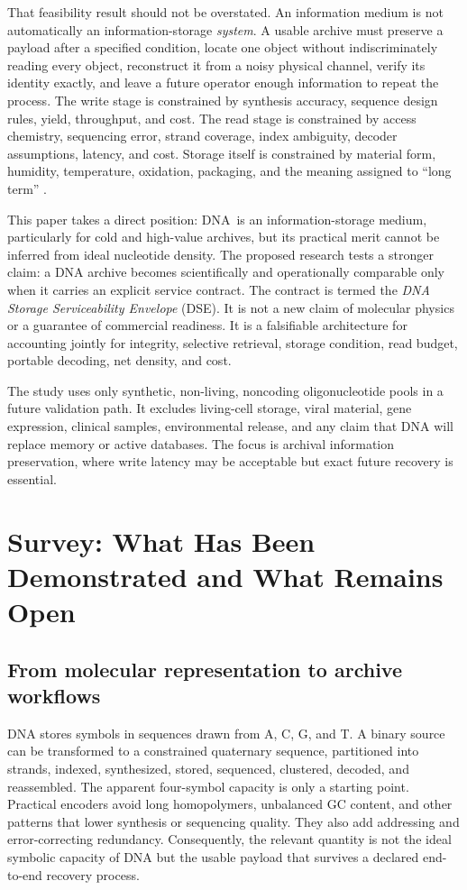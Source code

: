 \documentclass[conference]{IEEEtran}
\newcommand{\DSE}{\textsc{DSE}}
\newcommand{\DNA}{\textsc{DNA}}
\begin{document}
That feasibility result should not be overstated. An information medium is not automatically an information-storage \emph{system}. A usable archive must preserve a payload after a specified condition, locate one object without indiscriminately reading every object, reconstruct it from a noisy physical channel, verify its identity exactly, and leave a future operator enough information to repeat the process. The write stage is constrained by synthesis accuracy, sequence design rules, yield, throughput, and cost. The read stage is constrained by access chemistry, sequencing error, strand coverage, index ambiguity, decoder assumptions, latency, and cost. Storage itself is constrained by material form, humidity, temperature, oxidation, packaging, and the meaning assigned to ``long term'' \cite{matange2021,doricchi2022}.

This paper takes a direct position: \DNA\ is an information-storage medium, particularly for cold and high-value archives, but its practical merit cannot be inferred from ideal nucleotide density. The proposed research tests a stronger claim: a DNA archive becomes scientifically and operationally comparable only when it carries an explicit service contract. The contract is termed the \emph{DNA Storage Serviceability Envelope} (\DSE). It is not a new claim of molecular physics or a guarantee of commercial readiness. It is a falsifiable architecture for accounting jointly for integrity, selective retrieval, storage condition, read budget, portable decoding, net density, and cost.

The study uses only synthetic, non-living, noncoding oligonucleotide pools in a future validation path. It excludes living-cell storage, viral material, gene expression, clinical samples, environmental release, and any claim that DNA will replace memory or active databases. The focus is archival information preservation, where write latency may be acceptable but exact future recovery is essential.

\section{Survey: What Has Been Demonstrated and What Remains Open}

\subsection{From molecular representation to archive workflows}

DNA stores symbols in sequences drawn from A, C, G, and T. A binary source can be transformed to a constrained quaternary sequence, partitioned into strands, indexed, synthesized, stored, sequenced, clustered, decoded, and reassembled. The apparent four-symbol capacity is only a starting point. Practical encoders avoid long homopolymers, unbalanced GC content, and other patterns that lower synthesis or sequencing quality. They also add addressing and error-correcting redundancy. Consequently, the relevant quantity is not the ideal symbolic capacity of DNA but the usable payload that survives a declared end-to-end recovery process.
\end{document}
